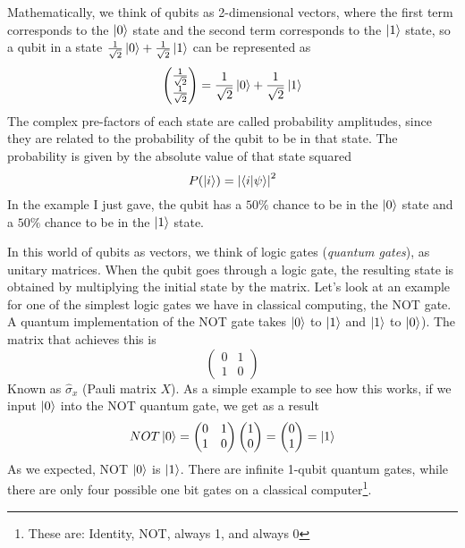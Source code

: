 Mathematically, we think of qubits as 2-dimensional vectors, where the first term corresponds to the $\ket{0}$ state and the second term corresponds to the $\ket{1}$ state, so a qubit in a state $\frac{1}{\sqrt{2}} \ket{0} + \frac{1}{\sqrt{2}} \ket{1}$ can be represented as
\[
\begin{pmatrix}
    \frac{1}{\sqrt{2}} \\
    \frac{1}{\sqrt{2}} 
\end{pmatrix} = \frac{1}{\sqrt{2}} \ket{0} + \frac{1}{\sqrt{2}} \ket{1}
\]
The complex pre-factors of each state are called probability amplitudes, since they are related to the probability of the qubit to be in that state. The probability is given by the absolute value of that state squared
\[
    P(\ket{i}) = \abs{\braket{i}{\psi}}^2
\]
In the example I just gave, the qubit has a $50\%$ chance to be in the $\ket{0}$ state and a $50\%$ chance to be in the $\ket{1}$ state.

In this world of qubits as vectors, we think of logic gates (\textit{quantum gates}), as unitary matrices. When the qubit goes through a logic gate, the resulting state is obtained by multiplying the initial state by the matrix. Let's look at an example for one of the simplest logic gates we have in classical computing, the NOT gate. A quantum implementation of the NOT gate takes $\ket{0}$ to $\ket{1}$ and $\ket{1}$ to $\ket{0}$). The matrix that achieves this is 
\[
\begin{pmatrix}
    0 & 1 \\
    1 & 0
\end{pmatrix}
\]
Known as $\hat{\sigma}_x$ (Pauli matrix $X$). As a simple example to see how this works, if we input $\ket{0}$ into the NOT quantum gate, we get as a result
\[
NOT \ket{0} = 
\begin{pmatrix}
    0 & 1 \\
    1 & 0
\end{pmatrix}
\begin{pmatrix}
    1 \\
    0
\end{pmatrix} = 
\begin{pmatrix}
    0 \\
    1
\end{pmatrix} = \ket{1}
\]
As we expected, NOT $\ket{0}$ is $\ket{1}$. There are infinite 1-qubit quantum gates, while there are only four possible one bit gates on a classical computer\footnote{These are: Identity, NOT, always 1, and always 0}.

